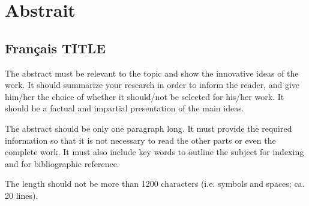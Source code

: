 \documentclass[./\jobname.tex]{subfiles}
\begin{document}
\chapter*{Abstrait}
\section*{Français TITLE}
%
The abstract must be relevant to the topic and show the innovative ideas of the work. It should summarize your research in order to inform the reader, and give him/her the choice of whether it should/not be selected for his/her work. It should be a factual and impartial presentation of the main ideas.\par
%
The abstract should be only one paragraph long. It must provide the required information so that it is not necessary to read the other parts or even the complete work. It must also include key words to outline the subject for indexing and for bibliographic reference.\par
%
The length should not be more than 1200 characters (i.e. symbols and spaces; ca. 20 lines).\par
%
\blindtext[2]
\end{document}
